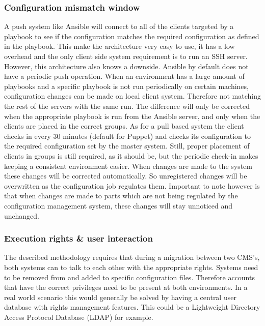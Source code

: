 \subsubsection{Configuration mismatch window}
A push system like Ansible will connect to all of the clients targeted by a playbook to see if the configuration matches the required configuration as defined in the playbook. This make the architecture very easy to use, it has a low overhead and the only client side system requirement is to run an SSH server. However, this architecture also knows a downside. Ansible by default does not have a periodic push operation. When an environment has a large amount of playbooks and a specific playbook is not run periodically on certain machines, configuration changes can be made on local client system. Therefore not matching the rest of the servers with the same run. The difference will only be corrected when the appropriate playbook is run from the Ansible server, and only when the clients are placed in the correct groups. As for a pull based system the client checks in every 30 minutes (default for Puppet) and checks its configuration to the required configuration set by the master system. Still, proper placement of clients in groups is still required, as it should be, but the periodic check-in makes keeping a consistent environment easier. When changes are made to the system these changes will be corrected automatically. So unregistered changes will be overwritten as the configuration job regulates them. Important to note however is that when changes are made to parts which are not being regulated by the configuration management system, these changes will stay unnoticed and unchanged.

\subsubsection{Execution rights \& user interaction}
The described methodology requires that during a migration between two CMS's, both systems can to talk to each other with the appropriate rights. Systems need to be removed from and added to specific configuration files. Therefore accounts that have the correct privileges need to be present at both environments. In a real world scenario this would generally be solved by having a central user database with rights management features. This could be a Lightweight Directory Access Protocol Database (LDAP) for example. 

